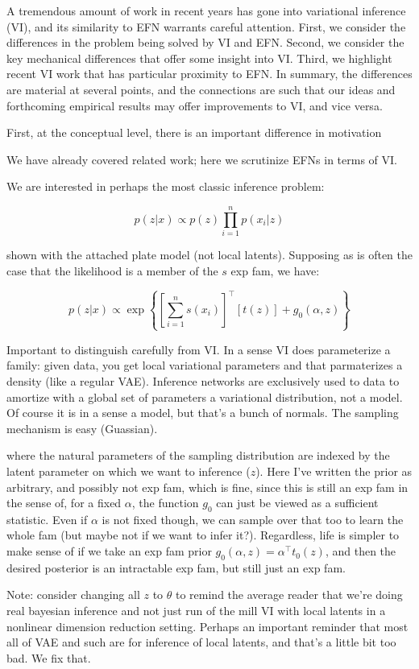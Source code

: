 \documentclass{article}
\begin{document}
A tremendous amount of work in recent years has gone into variational inference (VI), and its similarity to EFN warrants careful attention. First, we consider the differences in the problem being solved by VI and EFN.  Second, we consider the key mechanical differences that offer some insight into VI. Third, we highlight recent VI work that has particular proximity to EFN.  In summary, the differences are material at several points, and the connections are such that our ideas and forthcoming empirical results may offer improvements to VI, and vice versa.

First, at the conceptual level, there is an important difference in motivation 

 We have already covered related work; here we scrutinize EFNs in terms of VI.
 
We are interested in perhaps the most classic inference problem:

$$p(z | x) \propto p(z) \prod_{i=1}^n p(x_i | z)$$

 shown with the attached plate model (not local latents).  Supposing as is often the case that the likelihood is a member of the $s$ exp fam, we have:
 
 $$p(z | x ) \propto \exp\left\{ \left[ \sum_{i=1}^n s(x_i) \right]^\top\left[ t(z) \right] + g_0(\alpha,z) \right\}$$
 
 Important to distinguish carefully from VI.  In a sense VI does parameterize a family: given data, you get local variational parameters and that parmaterizes a density (like a regular VAE).  Inference networks are exclusively used to data to amortize with a global set of parameters a variational distribution, not a model.  Of course it is in a sense a model, but that's a bunch of normals.  The sampling mechanism is easy (Guassian).  
 
 where the natural parameters of the sampling distribution are indexed by the latent parameter on which we want to inference ($z$).  Here I've written the prior as arbitrary, and possibly not exp fam, which is fine, since this is still an exp fam in the  sense of, for a fixed $\alpha$, the function $g_0$ can just be viewed as a sufficient statistic.  Even if $\alpha$ is not fixed though, we can sample over that too to learn the whole fam (but maybe not if we want to infer it?).  Regardless, life is simpler to make sense of if we take an exp fam prior $g_0(\alpha,z) = \alpha^\top t_0(z)$, and then the desired posterior is an intractable exp fam, but still just an exp fam.
 
 Note: consider changing all $z$ to $\theta$ to remind the average reader that we're doing real bayesian inference and not just run of the mill VI with local latents in a nonlinear dimension reduction setting.  Perhaps an important reminder that most all of VAE and such are for inference of local latents, and that's a little bit too bad.  We fix that.
\end{document}
